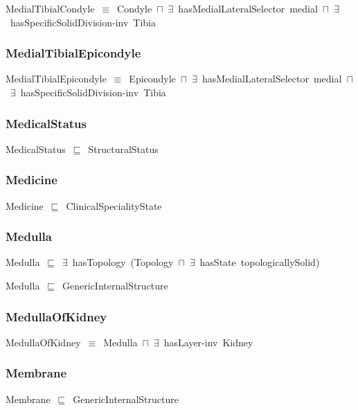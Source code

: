 \documentclass{article}
\begin{document}
MedialTibialCondyle~\ensuremath{\equiv}~Condyle~\ensuremath{\sqcap}~\ensuremath{\exists}~hasMedialLateralSelector~medial~\ensuremath{\sqcap}~\ensuremath{\exists}~hasSpecificSolidDivision-inv~Tibia

\subsubsection*{MedialTibialEpicondyle}

MedialTibialEpicondyle~\ensuremath{\equiv}~Epicondyle~\ensuremath{\sqcap}~\ensuremath{\exists}~hasMedialLateralSelector~medial~\ensuremath{\sqcap}~\ensuremath{\exists}~hasSpecificSolidDivision-inv~Tibia

\subsubsection*{MedicalStatus}

MedicalStatus~\ensuremath{\sqsubseteq}~StructuralStatus~

\subsubsection*{Medicine}

Medicine~\ensuremath{\sqsubseteq}~ClinicalSpecialityState~

\subsubsection*{Medulla}

Medulla~\ensuremath{\sqsubseteq}~\ensuremath{\exists}~hasTopology~(Topology~\ensuremath{\sqcap}~\ensuremath{\exists}~hasState~topologicallySolid)~

Medulla~\ensuremath{\sqsubseteq}~GenericInternalStructure~

\subsubsection*{MedullaOfKidney}

MedullaOfKidney~\ensuremath{\equiv}~Medulla~\ensuremath{\sqcap}~\ensuremath{\exists}~hasLayer-inv~Kidney

\subsubsection*{Membrane}

Membrane~\ensuremath{\sqsubseteq}~GenericInternalStructure~
\end{document}
